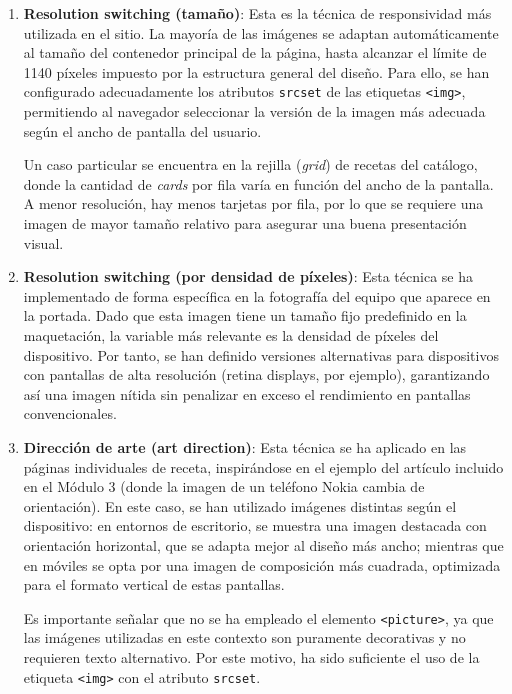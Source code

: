 \documentclass{article}
\begin{document}
\begin{enumerate}
    \item \textbf{Resolution switching (tamaño)}: Esta es la técnica de responsividad más utilizada en el sitio. La mayoría de las imágenes se adaptan automáticamente al tamaño del contenedor principal de la página, hasta alcanzar el límite de 1140 píxeles impuesto por la estructura general del diseño. Para ello, se han configurado adecuadamente los atributos \texttt{srcset} de las etiquetas \texttt{<img>}, permitiendo al navegador seleccionar la versión de la imagen más adecuada según el ancho de pantalla del usuario.

    Un caso particular se encuentra en la rejilla (\textit{grid}) de recetas del catálogo, donde la cantidad de \textit{cards} por fila varía en función del ancho de la pantalla. A menor resolución, hay menos tarjetas por fila, por lo que se requiere una imagen de mayor tamaño relativo para asegurar una buena presentación visual.

    \item \textbf{Resolution switching (por densidad de píxeles)}: Esta técnica se ha implementado de forma específica en la fotografía del equipo que aparece en la portada. Dado que esta imagen tiene un tamaño fijo predefinido en la maquetación, la variable más relevante es la densidad de píxeles del dispositivo. Por tanto, se han definido versiones alternativas para dispositivos con pantallas de alta resolución (retina displays, por ejemplo), garantizando así una imagen nítida sin penalizar en exceso el rendimiento en pantallas convencionales.

    \item \textbf{Dirección de arte (art direction)}: Esta técnica se ha aplicado en las páginas individuales de receta, inspirándose en el ejemplo del artículo incluido en el Módulo 3 (donde la imagen de un teléfono Nokia cambia de orientación). En este caso, se han utilizado imágenes distintas según el dispositivo: en entornos de escritorio, se muestra una imagen destacada con orientación horizontal, que se adapta mejor al diseño más ancho; mientras que en móviles se opta por una imagen de composición más cuadrada, optimizada para el formato vertical de estas pantallas.

    Es importante señalar que no se ha empleado el elemento \texttt{<picture>}, ya que las imágenes utilizadas en este contexto son puramente decorativas y no requieren texto alternativo. Por este motivo, ha sido suficiente el uso de la etiqueta \texttt{<img>} con el atributo \texttt{srcset}.
\end{enumerate}
\end{document}
